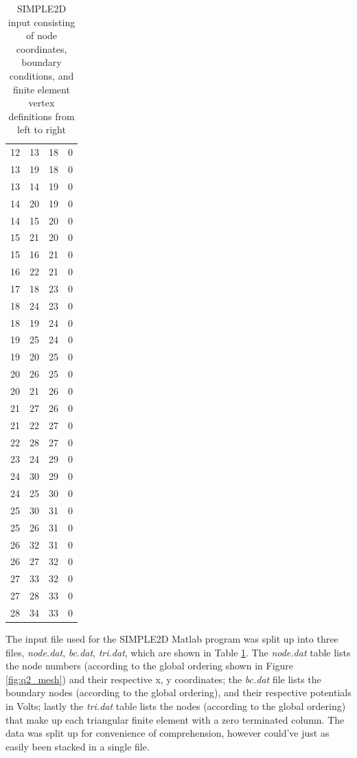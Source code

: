 \documentclass[11pt]{amsart}
\begin{document}
\begin{table}[t]
\begin{tabular}[t]{c c c c}
        12  &    13&     18 &0\\
        13  &    19&     18 &0\\
        13  &    14&     19 &0\\
        14  &    20&     19 &0\\
        14  &    15&     20 &0\\
        15  &    21&     20 &0\\
        15  &    16&     21 &0\\
        16  &    22&     21 &0\\
        17  &    18 &    23 &0\\
        18  &    24&     23 &0\\
        18  &    19&     24 &0\\
        19  &    25&     24 &0\\
        19  &    20&     25 &0\\
        20  &    26&     25 &0\\
        20  &    21&     26 &0\\
        21  &    27&     26 &0\\
        21  &    22&     27 &0\\
        22  &    28&     27 &0\\
        23  &    24&     29 &0\\
        24  &    30&     29 &0\\
        24  &    25&     30 &0\\
        25  &    30&     31 &0\\
        25  &    26&     31 &0\\
        26  &    32&     31 &0\\
        26  &    27&     32 &0\\
        27  &    33&     32 &0\\
        27  &    28&     33 &0\\
        28  &    34&     33 &0\\        
    \end{tabular}
    \caption{SIMPLE2D input consisting of node coordinates, boundary conditions, and finite element vertex definitions from left to right}
    \label{tb:input}
\end{table}

The input file used for the SIMPLE2D Matlab program was split up into three files, \textit{node.dat}, \textit{bc.dat}, \textit{tri.dat}, which are shown in Table \ref{tb:input}. The \textit{node.dat} table lists the node numbers (according to the global ordering shown in Figure \ref{fig:q2_mesh}) and their respective x, y coordinates; the \textit{bc.dat} file lists the boundary nodes (according to the global ordering), and their respective potentials in Volts; lastly the \textit{tri.dat} table lists the nodes (according to the global ordering) that make up each triangular finite element with a zero terminated column. The data was split up for convenience of comprehension, however could've just as easily been stacked in a single file.
\end{document}
